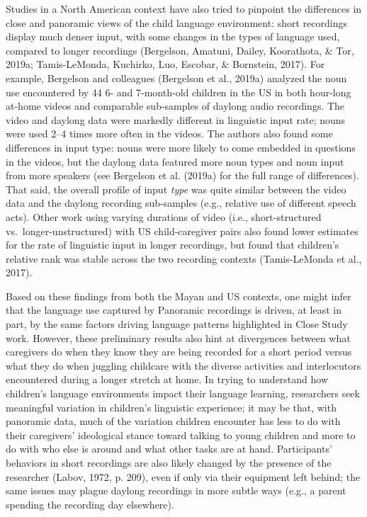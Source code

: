 \documentclass[,man,floatsintext]{apa6}
\begin{document}
Studies in a North American context have also tried to pinpoint the
differences in close and panoramic views of the child language
environment: short recordings display much denser input, with some
changes in the types of language used, compared to longer recordings
(Bergelson, Amatuni, Dailey, Koorathota, \& Tor, 2019a; Tamis-LeMonda,
Kuchirko, Luo, Escobar, \& Bornstein, 2017). For example, Bergelson and
colleagues (Bergelson et al., 2019a) analyzed the noun use encountered
by 44 6- and 7-month-old children in the US in both hour-long at-home
videos and comparable sub-samples of daylong audio recordings. The video
and daylong data were markedly different in linguistic input rate; nouns
were used 2--4 times more often in the videos. The authors also found
some differences in input type: nouns were more likely to come embedded
in questions in the videos, but the daylong data featured more noun
types and noun input from more speakers (see Bergelson et al. (2019a)
for the full range of differences). That said, the overall profile of
input \emph{type} was quite similar between the video data and the
daylong recording sub-samples (e.g., relative use of different speech
acts). Other work using varying durations of video (i.e.,
short-structured vs.~longer-unstructured) with US child-caregiver pairs
also found lower estimates for the rate of linguistic input in longer
recordings, but found that children's relative rank was stable across
the two recording contexts (Tamis-LeMonda et al., 2017).

Based on these findings from both the Mayan and US contexts, one might
infer that the language use captured by Panoramic recordings is driven,
at least in part, by the same factors driving language patterns
highlighted in Close Study work. However, these preliminary results also
hint at divergences between what caregivers do when they know they are
being recorded for a short period versus what they do when juggling
childcare with the diverse activities and interlocutors encountered
during a longer stretch at home. In trying to understand how children's
language environments impact their language learning, researchers seek
meaningful variation in children's linguistic experience; it may be
that, with panoramic data, much of the variation children encounter has
less to do with their caregivers' ideological stance toward talking to
young children and more to do with who else is around and what other
tasks are at hand. Participants' behaviors in short recordings are also
likely changed by the presence of the researcher (Labov, 1972, p. 209),
even if only via their equipment left behind; the same issues may plague
daylong recordings in more subtle ways (e.g., a parent spending the
recording day elsewhere).
\end{document}
